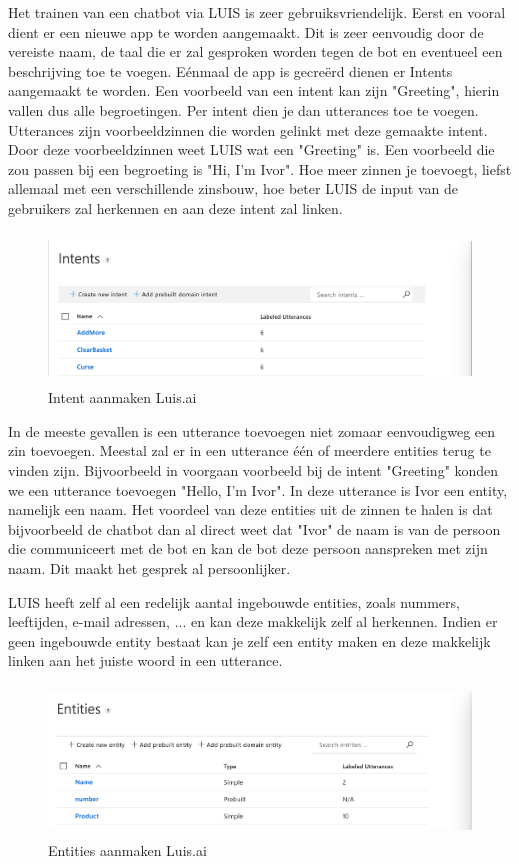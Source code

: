 Het trainen van een chatbot via LUIS is zeer gebruiksvriendelijk. Eerst en vooral dient er een nieuwe app te worden aangemaakt. Dit is zeer eenvoudig door de vereiste naam, de taal die er zal gesproken worden tegen de bot en eventueel een beschrijving toe te voegen. Eénmaal de app is gecreërd dienen er Intents aangemaakt te worden. Een voorbeeld van een intent kan zijn "Greeting", hierin vallen dus alle begroetingen. Per intent dien je dan utterances toe te voegen. Utterances zijn voorbeeldzinnen die worden gelinkt met deze gemaakte intent. Door deze voorbeeldzinnen weet LUIS wat een "Greeting" is. Een voorbeeld die zou passen bij een begroeting is "Hi, I'm Ivor". Hoe meer zinnen je toevoegt, liefst allemaal met een verschillende zinsbouw, hoe beter LUIS de input van de gebruikers zal herkennen en aan deze intent zal linken.


\begin{figure}[h!]
	\centering
	\includegraphics[height=4cm]{img/intents.png}
	\caption{Intent aanmaken Luis.ai}
	\label{fig:intents}
\end{figure}

In de meeste gevallen is een utterance toevoegen niet zomaar eenvoudigweg een zin toevoegen. Meestal zal er in een utterance één of meerdere entities terug te vinden zijn. Bijvoorbeeld in voorgaan voorbeeld bij de intent "Greeting" konden we een utterance toevoegen "Hello, I'm Ivor". In deze utterance is Ivor een entity, namelijk een naam. Het voordeel van deze entities uit de zinnen te halen is dat bijvoorbeeld de chatbot dan al direct weet dat "Ivor" de naam is van de persoon die communiceert met de bot en kan de bot deze persoon aanspreken met zijn naam. Dit maakt het gesprek al persoonlijker.

LUIS heeft zelf al een redelijk aantal ingebouwde entities, zoals nummers, leeftijden, e-mail adressen, ... en kan deze makkelijk zelf al herkennen. Indien er geen ingebouwde entity bestaat kan je zelf een entity maken en deze makkelijk linken aan het juiste woord in een utterance.

\begin{figure}[h!]
	\centering
	\includegraphics[height=4cm]{img/entity.png}
	\caption{Entities aanmaken Luis.ai}
	\label{fig:entity}
\end{figure}

